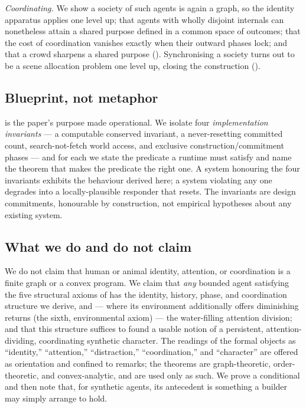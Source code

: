 \documentclass[11pt,twocolumn,a4paper]{article}
\begin{document}
\emph{Coordinating.} We show a society of such agents is again a graph, so
the identity apparatus applies one level up; that agents with wholly
disjoint internals can nonetheless attain a shared purpose defined in a
common space of outcomes; that the cost of coordination vanishes exactly
when their outward phases lock; and that a crowd sharpens a shared purpose
(). Synchronising a society turns out to be a scene
allocation problem one level up, closing the construction
().

\subsection{Blueprint, not metaphor}

 is the paper's purpose made operational. We isolate
four \emph{implementation invariants} --- a computable conserved invariant,
a never-resetting committed count, search-not-fetch world access, and
exclusive construction/commitment phases --- and for each we state the
predicate a runtime must satisfy and name the theorem that makes the
predicate the right one. A system honouring the four invariants exhibits
the behaviour derived here; a system violating any one degrades into a
locally-plausible responder that resets. The invariants are design
commitments, honourable by construction, not empirical hypotheses about
any existing system.

\subsection{What we do and do not claim}

We do not claim that human or animal identity, attention, or coordination
is a finite graph or a convex program. We claim that \emph{any} bounded
agent satisfying the five structural axioms of  has the
identity, history, phase, and coordination structure we derive, and ---
where its environment additionally offers diminishing returns (the sixth,
environmental axiom) --- the water-filling attention division; and that this
structure suffices to found a usable notion of a persistent,
attention-dividing, coordinating synthetic character. The
readings of the formal objects as ``identity,'' ``attention,''
``distraction,'' ``coordination,'' and ``character'' are offered as
orientation and confined to remarks; the theorems are graph-theoretic,
order-theoretic, and convex-analytic, and are used only as such. We prove
a conditional and then note that, for synthetic agents, its antecedent is
something a builder may simply arrange to hold.
\end{document}
